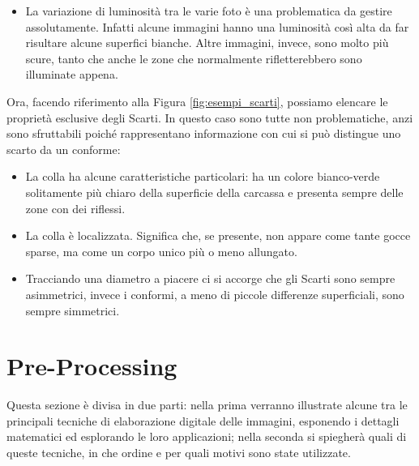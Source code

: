 \begin{itemize}

  \item La variazione di luminosità tra le varie foto è una problematica da gestire assolutamente.
    Infatti alcune immagini hanno una luminosità così alta da far risultare alcune superfici bianche.
    Altre immagini, invece, sono molto più scure, tanto che anche le zone che normalmente rifletterebbero sono illuminate appena.

\end{itemize}

Ora, facendo riferimento alla Figura \ref{fig:esempi_scarti}, possiamo elencare le proprietà esclusive degli Scarti.
In questo caso sono tutte non problematiche, anzi sono sfruttabili poiché rappresentano informazione con cui si può distingue uno scarto da un conforme:
\begin{itemize}
  \item La colla ha alcune caratteristiche particolari: ha un colore bianco-verde solitamente più chiaro della superficie della carcassa e presenta sempre delle zone con dei riflessi.

  \item La colla è localizzata.
    Significa che, se presente, non appare come tante gocce sparse, ma come un corpo unico più o meno allungato.

  \item Tracciando una diametro a piacere ci si accorge che gli Scarti sono sempre asimmetrici, invece i conformi, a meno di piccole differenze superficiali, sono sempre simmetrici.

\end{itemize}



\clearpage
\section{Pre-Processing}
Questa sezione è divisa in due parti: nella prima verranno illustrate alcune tra le principali tecniche di elaborazione digitale delle immagini, esponendo i dettagli matematici ed esplorando le loro applicazioni; nella seconda si spiegherà quali di queste tecniche, in che ordine e per quali motivi sono state utilizzate.

